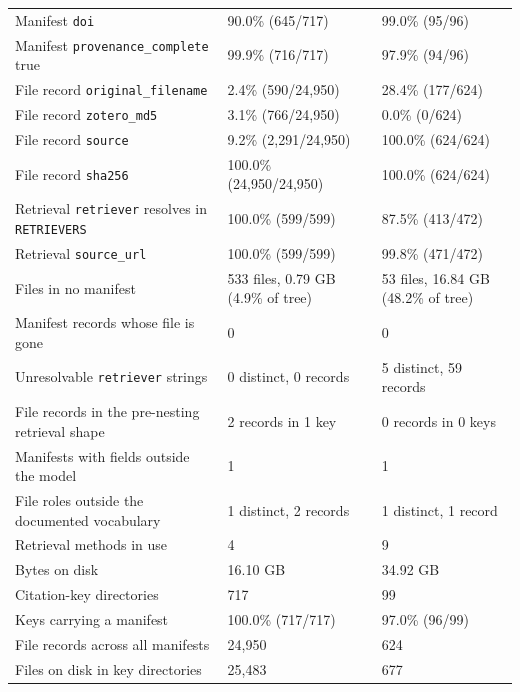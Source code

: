 \begin{table}[H]
\begin{tabular}{@{}L{74mm} L{48mm} L{48mm}@{}}
Manifest \texttt{doi} & 90.0\% (645/717) & 99.0\% (95/96) \\
Manifest \texttt{provenance\_complete} true & 99.9\% (716/717) & 97.9\% (94/96) \\
File record \texttt{original\_filename} & 2.4\% (590/24,950) & 28.4\% (177/624) \\
File record \texttt{zotero\_md5} & 3.1\% (766/24,950) & 0.0\% (0/624) \\
File record \texttt{source} & 9.2\% (2,291/24,950) & 100.0\% (624/624) \\
File record \texttt{sha256} & 100.0\% (24,950/24,950) & 100.0\% (624/624) \\
Retrieval \texttt{retriever} resolves in \texttt{RETRIEVERS} & 100.0\% (599/599) & 87.5\% (413/472) \\
Retrieval \texttt{source\_url} & 100.0\% (599/599) & 99.8\% (471/472) \\
\midrule
Files in no manifest & 533 files, 0.79 GB (4.9\% of tree) & 53 files, 16.84 GB (48.2\% of tree) \\
Manifest records whose file is gone & 0 & 0 \\
Unresolvable \texttt{retriever} strings & 0 distinct, 0 records & 5 distinct, 59 records \\
File records in the pre-nesting retrieval shape & 2 records in 1 key & 0 records in 0 keys \\
Manifests with fields outside the model & 1 & 1 \\
File roles outside the documented vocabulary & 1 distinct, 2 records & 1 distinct, 1 record \\
Retrieval methods in use & 4 & 9 \\
\midrule
Bytes on disk & 16.10 GB & 34.92 GB \\
Citation-key directories & 717 & 99 \\
Keys carrying a manifest & 100.0\% (717/717) & 97.0\% (96/99) \\
File records across all manifests & 24,950 & 624 \\
Files on disk in key directories & 25,483 & 677 \\
\bottomrule
\end{tabular}
\end{table}
